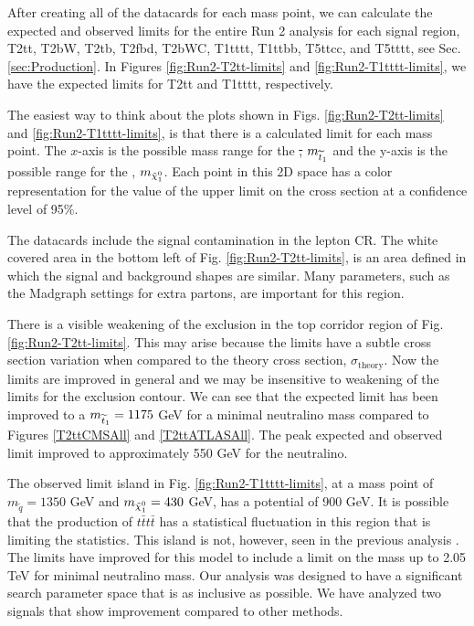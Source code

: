 After creating all of the datacards for each mass point, we can calculate the expected and observed limits for the entire Run 2 analysis for each signal region, T2tt, T2bW, T2tb, T2fbd, T2bWC, T1tttt, T1ttbb, T5ttcc, and T5tttt, see Sec. \ref{sec:Production}. In Figures \ref{fig:Run2-T2tt-limits} and \ref{fig:Run2-T1tttt-limits}, we have the expected limits for T2tt and T1tttt, respectively. 

The easiest way to think about the plots shown in Figs. \ref{fig:Run2-T2tt-limits} and \ref{fig:Run2-T1tttt-limits}, is that there is a calculated limit for each mass point. The $x$-axis is the possible mass range for the \st, $m_{\widetilde{t}_1}$ and the y-axis is the possible range for the \neutralino, $m_{\tilde{\chi}^{0}_{1}}$. Each point in this 2D space has a color representation for the value of the upper limit on the cross section at a confidence level of 95\%. 

The datacards include the signal contamination in the lepton CR. The white covered area in the bottom left of Fig. \ref{fig:Run2-T2tt-limits}, is an area defined in which the signal and background shapes are similar. Many parameters, such as the Madgraph settings for extra partons, are important for this region.

There is a visible weakening of the exclusion in the top corridor region of Fig. \ref{fig:Run2-T2tt-limits}. This may arise because the limits have a subtle cross section variation when compared to the theory cross section, $\sigma_{\text{theory}}$. Now the limits are improved in general and we may be insensitive to weakening of the limits for the exclusion contour. We can see that the expected limit has been improved to a $m_{\widetilde{t}_1}=1175$ GeV for a minimal neutralino mass compared to Figures \ref{T2ttCMSAll} and \ref{T2ttATLASAll}. The peak expected and observed limit improved to approximately 550 GeV for the neutralino. 

The observed limit island in Fig. \ref{fig:Run2-T1tttt-limits}, at a mass point of $m_{\widetilde{q}}=1350$ GeV and $m_{\tilde{\chi}^{0}_{1}}=430$ GeV, has a potential \met{} of 900 GeV. It is possible that the production of $t\bar{t}t\bar{t}$ has a statistical fluctuation in this region that is limiting the statistics. This island is not, however, seen in the previous analysis \cite{cms_collaboration_search_2018}. The limits have improved for this model to include a limit on the mass up to 2.05 TeV for minimal neutralino mass. Our analysis was designed to have a significant search parameter space that is as inclusive as possible. We have analyzed two signals that show improvement compared to other methods. 
